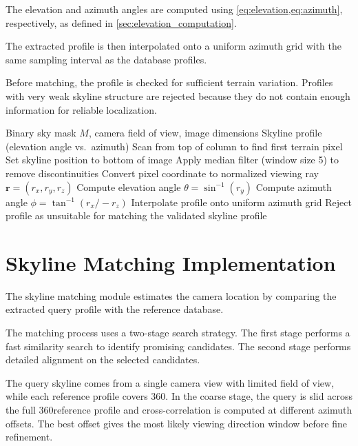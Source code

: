 The elevation and azimuth angles are computed using \cref{eq:elevation,eq:azimuth}, respectively, as defined in \cref{sec:elevation_computation}.

The extracted profile is then interpolated onto a uniform azimuth grid with the same sampling interval as the database profiles.

Before matching, the profile is checked for sufficient terrain variation. Profiles with very weak skyline structure are rejected because they do not contain enough information for reliable localization.

\begin{algorithm}[!ht]
\caption{Skyline Extraction from Binary Sky Mask}
\label{alg:skyline_extraction}
\begin{algorithmic}[1]
\Require Binary sky mask $M$, camera field of view, image dimensions
\Ensure Skyline profile (elevation angle vs.\ azimuth)
    \State Scan from top of column to find first terrain pixel
        \State Set skyline position to bottom of image
    \EndIf
\EndFor
\State Apply median filter (window size 5) to remove discontinuities
    \State Convert pixel coordinate to normalized viewing ray $\mathbf{r} = (r_x, r_y, r_z)$
    \State Compute elevation angle $\theta = \sin^{-1}(r_y)$
    \State Compute azimuth angle $\phi = \tan^{-1}(r_x / -r_z)$
\EndFor
\State Interpolate profile onto uniform azimuth grid
    \State Reject profile as unsuitable for matching
\EndIf
\State \Return the validated skyline profile
\end{algorithmic}
\end{algorithm}

\section{Skyline Matching Implementation}

The skyline matching module estimates the camera location by comparing the extracted query profile with the reference database.

The matching process uses a two-stage search strategy. The first stage performs a fast similarity search to identify promising candidates. The second stage performs detailed alignment on the selected candidates.

The query skyline comes from a single camera view with limited field of view, while each reference profile covers 360\textdegree. In the coarse stage, the query is slid across the full 360\textdegree reference profile and cross-correlation is computed at different azimuth offsets. The best offset gives the most likely viewing direction window before fine refinement.

